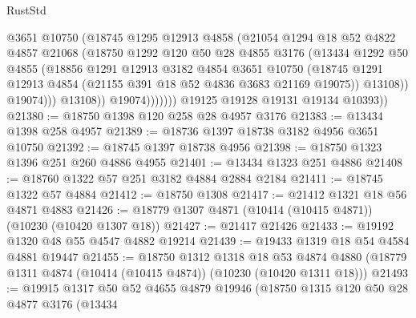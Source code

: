 \begin{lexlean}{RustStd}
\begin{coremodule}
                          @3651
                          @10750
                          (@18745
                            @1295
                            @12913
                            @4858
                            (@21054
                              @1294
                              @18
                              @52
                              @4822
                              @4857
                              @21068
                              (@18750
                                @1292
                                @120
                                @50
                                @28
                                @4855
                                @3176
                                (@13434
                                  @1292
                                  @50
                                  @4855
                                  (@18856
                                    @1291
                                    @12913
                                    @3182
                                    @4854
                                    @3651
                                    @10750
                                    (@18745
                                      @1291
                                      @12913
                                      @4854
                                      (@21155 @391 @18 @52 @4836 @3683 @21169 @19075))
                                    @13108))
                                @19074)))
                          @13108))
                      @19074)))))))
        @19125
        @19128
        @19131
        @19134
        @10393))
@21380 := @18750 @1398 @120 @258 @28 @4957 @3176
@21383 := @13434 @1398 @258 @4957
@21389 := @18736 @1397 @18738 @3182 @4956 @3651 @10750
@21392 := @18745 @1397 @18738 @4956
@21398 := @18750 @1323 @1396 @251 @260 @4886 @4955
@21401 := @13434 @1323 @251 @4886
@21408 := @18760 @1322 @57 @251 @3182 @4884 @2884 @2184
@21411 := @18745 @1322 @57 @4884
@21412 := @18750 @1308
@21417 := @21412 @1321 @18 @56 @4871 @4883
@21426 := @18779 @1307 @4871 (@10414 (@10415 @4871)) (@10230 (@10420 @1307 @18))
@21427 := @21417 @21426
@21433 := @19192 @1320 @48 @55 @4547 @4882 @19214
@21439 := @19433 @1319 @18 @54 @4584 @4881 @19447
@21455 := @18750
    @1312
    @1318
    @18
    @53
    @4874
    @4880
    (@18779 @1311 @4874 (@10414 (@10415 @4874)) (@10230 (@10420 @1311 @18)))
@21493 := @19915
    @1317
    @50
    @52
    @4655
    @4879
    @19946
    (@18750
      @1315
      @120
      @50
      @28
      @4877
      @3176
      (@13434

\end{coremodule}
\end{lexlean}
